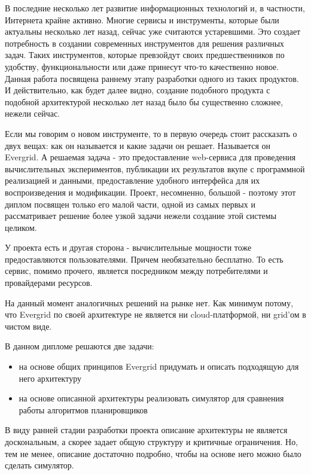 \intro


В последние несколько лет развитие информационных технологий и, в частности, Интернета крайне активно. Многие сервисы и инструменты, которые были актуальны несколько лет назад, сейчас уже считаются устаревшими. Это создает потребность в создании современных инструментов для решения различных задач. Таких инструментов, которые превзойдут своих предшественников по удобству, функциональности или даже принесут что-то качественно новое. Данная работа посвящена раннему этапу разработки одного из таких продуктов. И действительно, как будет далее видно, создание подобного продукта с подобной архитектурой несколько лет назад было бы существенно сложнее, нежели сейчас.

Если мы говорим о новом инструменте, то в первую очередь стоит рассказать о двух вещах: как он называется и какие задачи он решает. Называется он Evergrid. А решаемая задача - это предоставление web-сервиса для проведения вычислительных экспериментов, публикации их результатов вкупе с программной реализацией и данными, предоставление удобного интерфейса для их воспроизведения и модификации. Проект, несомненно, большой - поэтому этот диплом посвящен только его малой части, одной из самых первых и рассматривает решение более узкой задачи нежели создание этой системы целиком.

У проекта есть и другая сторона - вычислительные мощности тоже предоставляются пользователями. Причем необязательно бесплатно. То есть сервис, помимо прочего, является посредником между потребителями и провайдерами ресурсов.

На данный момент аналогичных решений на рынке нет. Как минимум потому, что Evergrid по своей архитектуре не является ни cloud-платформой, ни grid'ом в чистом виде.

В данном дипломе решаются две задачи:

\begin{itemize}
	\item на основе общих принципов Evergrid придумать и описать подходящую для него архитектуру
	\item на основе описанной архитектуры реализовать симулятор для сравнения работы алгоритмов планировщиков
\end{itemize}

В виду ранней стадии разработки проекта описание архитектуры не является доскональным, а скорее задает общую структуру и критичные ограничения. Но, тем не менее, описание достаточно подробно, чтобы на основе него можно было сделать симулятор.

